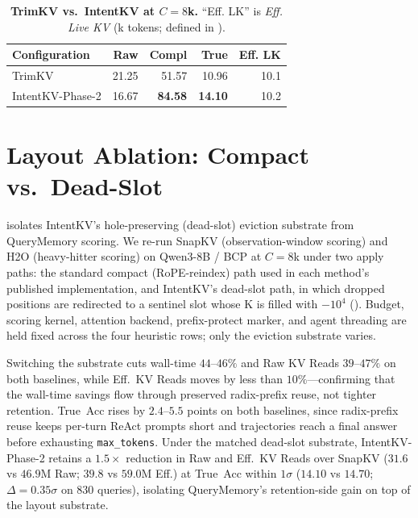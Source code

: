 \documentclass[11pt]{article}
\newcommand{\method}{IntentKV\xspace}
\newcommand{\learn}{Phase-2\xspace}
\begin{document}
\begin{table}[!htbp]
\centering
\footnotesize
\caption{\textbf{TrimKV vs.\ \method at $C{=}8$k.} ``Eff. LK'' is
\emph{Eff. Live KV} (k tokens; defined in
).}
\label{tab:design-axis}
\setlength{\tabcolsep}{4pt}
\begin{tabular*}{\columnwidth}{@{\extracolsep{\fill}} lrrrr}
\toprule
Configuration & Raw & Compl & True & Eff. LK \\
\midrule
TrimKV          & 21.25 & 51.57 & 10.96 & 10.1 \\
\method-\learn  & 16.67 & \textbf{84.58} & \textbf{14.10} & 10.2 \\
\bottomrule
\end{tabular*}
\end{table}

\section{Layout Ablation: Compact vs.\ Dead-Slot}
\label{appendix:layout-ablation}

 isolates \method's hole-preserving (dead-slot)
eviction substrate from QueryMemory scoring. We re-run SnapKV
(observation-window scoring) and H2O (heavy-hitter scoring) on
Qwen3-8B / BCP at $C{=}8$k under two apply paths: the standard compact
(RoPE-reindex) path used in each method's published implementation,
and \method's dead-slot path, in which dropped positions are
redirected to a sentinel slot whose K is filled with $-10^{4}$
(). Budget, scoring kernel, attention backend,
prefix-protect marker, and agent threading are held fixed across the
four heuristic rows; only the eviction substrate varies.

Switching the substrate cuts wall-time $44$--$46\%$ and Raw KV Reads
$39$--$47\%$ on both baselines, while Eff.\ KV Reads moves by less
than $10\%$---confirming that the wall-time savings flow through
preserved radix-prefix reuse, not tighter retention. True~Acc rises
by $2.4$--$5.5$ points on both baselines, since radix-prefix reuse
keeps per-turn ReAct prompts short and trajectories reach a final
answer before exhausting \texttt{max\_tokens}. Under the matched
dead-slot substrate, \method-\learn retains a $1.5\times$ reduction
in Raw and Eff.\ KV Reads over SnapKV ($31.6$ vs $46.9$M Raw; $39.8$
vs $59.0$M Eff.) at True~Acc within $1\sigma$ ($14.10$ vs $14.70$;
$\Delta{=}0.35\sigma$ on $830$ queries), isolating QueryMemory's
retention-side gain on top of the layout substrate.
\end{document}
